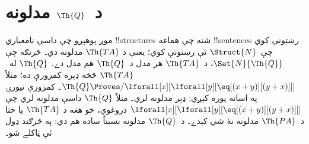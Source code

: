 \documentclass[../../../include/open-logic-section]{subfiles}
\begin{document}
\section{د~$\Th{Q}$ مدلونه}

\begin{explain}
موږ پوهېږو چې داسې نامعياري !!{structure}s شته چې هماغه
!!{sentence}s رښتونې کوي چې~$\Struct{N}$ ئې رښتونې کوي؛ يعنې د
$\Th{TA}$ مدلونه دي۔ څرنګه چې $\Sat{N}{\Th{Q}}$، د~$\Th{TA}$ هر
مدل د~$\Th{Q}$ هم مدل دے۔ $\Th{Q}$ له~$\Th{TA}$ څخه ډېره کمزورې
ده؛ مثلاً
$\Th{Q} \Proves/ \lforall[x][\lforall[y][\eq[(x + y)][(y+x)]]]$۔
کمزورې تيورۍ په اسانه پوره کېږي: ډېر مدلونه لري۔ مثلاً $\Th{Q}$
داسې مدلونه لري چې
$\lforall[x][\lforall[y][\eq[(x + y)][(y+x)]]]$ دروغوي، خو هغه د
$\Th{TA}$ يا حتا د~$\Th{PA}$ مدلونه نۀ شي کېدے۔ د~$\Th{Q}$ مدلونه
نسبتاً ساده هم دي: په څرګند ډول ئې ټاکلے شو۔
\end{explain}
\end{document}
